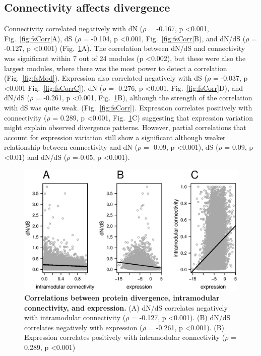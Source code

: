 \subsection{Connectivity affects divergence}
Connectivity correlated negatively with  dN ($\rho$ = -0.167, p \textless 0.001,  Fig.~\ref{fig:fsCorr}A), dS ($\rho$ = -0.104, p \textless 0.001, Fig.~\ref{fig:fsCorr}B), and dN/dS ($\rho$ = -0.127, p \textless 0.001) (Fig.~\ref{fig:f1}A). The correlation between dN/dS and connectivity was significant within 7 out of 24 modules (p \textless 0.002), but these were also the largest modules, where there was the most power to detect a correlation (Fig.~\ref{fig:fsMod}). Expression also correlated negatively with dS ($\rho$ = -0.037, p \textless 0.001 Fig.~\ref{fig:fsCorrC}), dN ($\rho$ = -0.276, p \textless 0.001, Fig.~\ref{fig:fsCorr}D), and dN/dS ($\rho$ = -0.261, p \textless 0.001, Fig.~\ref{fig:f1}B),  although the strength of the correlation with dS was quite weak. (Fig.~\ref{fig:fsCorr}). Expression correlates positively with connectivity ($\rho$ = 0.289, p \textless 0.001, Fig.~\ref{fig:f1}C) suggesting that expression variation might explain observed divergence patterns. However, partial correlations that account for expression variation still show a significant although weaker relationship between connectivity and dN ($\rho$ = -0.09, p \textless 0.001), dS ($\rho$ =-0.09, p \textless 0.01) and dN/dS ($\rho$ =-0.05, p \textless 0.001). 

\begin{figure}[ht!]
\centering
\includegraphics[width=\linewidth]{Ch4Fig1}
\caption{\textbf{Correlations between protein divergence, intramodular connectivity, and expression.} (A) dN/dS correlates negatively with intramodular connectivity ($\rho$ = -0.127, p \textless 0.001). (B) dN/dS correlates negatively with expression ($\rho$ = -0.261, p \textless 0.001). (B) Expression correlates positively with intramodular connectivity ($\rho$ = 0.289, p \textless 0.001)}
\label{fig:f1}
\end{figure}


